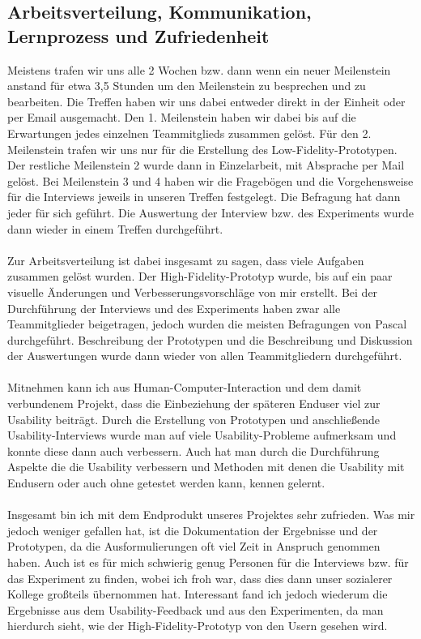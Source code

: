 \documentclass[a4paper,10pt]{scrartcl}
\begin{document}
\subsection{Arbeitsverteilung, Kommunikation, Lernprozess und Zufriedenheit}



Meistens trafen wir uns alle 2 Wochen bzw. dann wenn ein neuer Meilenstein anstand für etwa 3,5 Stunden um den Meilenstein zu besprechen und zu bearbeiten. Die Treffen haben wir uns
dabei entweder direkt in der Einheit oder per Email ausgemacht. Den 1. Meilenstein haben wir dabei bis auf die Erwartungen jedes einzelnen Teammitglieds zusammen gelöst.
Für den 2. Meilenstein trafen wir uns nur für die Erstellung des Low-Fidelity-Prototypen. Der restliche Meilenstein 2 wurde dann in Einzelarbeit, mit Absprache per Mail
gelöst. Bei Meilenstein 3 und 4 haben wir die Fragebögen und die Vorgehensweise für die Interviews
jeweils in unseren Treffen festgelegt. Die Befragung hat dann jeder für sich geführt. Die Auswertung der Interview bzw. des Experiments wurde dann wieder in einem Treffen
durchgeführt.
\\ \\
Zur Arbeitsverteilung ist dabei insgesamt zu sagen, dass viele Aufgaben zusammen gelöst wurden. Der High-Fidelity-Prototyp wurde, bis auf ein paar visuelle Änderungen
und Verbesserungsvorschläge von mir erstellt.
Bei der Durchführung der Interviews und des Experiments haben zwar alle Teammitglieder beigetragen, jedoch wurden die meisten Befragungen von Pascal durchgeführt. Beschreibung
der Prototypen und die Beschreibung und Diskussion der Auswertungen wurde dann wieder von allen Teammitgliedern durchgeführt.
\\ \\
Mitnehmen kann ich aus Human-Computer-Interaction und dem damit verbundenem Projekt, dass die Einbeziehung der späteren Enduser viel zur Usability beiträgt. Durch die Erstellung von Prototypen und anschließende Usability-Interviews wurde man auf viele Usability-Probleme aufmerksam und
konnte diese dann auch verbessern. Auch hat man durch die Durchführung Aspekte die die Usability verbessern und Methoden mit denen die Usability mit Endusern oder auch ohne
getestet werden kann, kennen gelernt.
\\ \\
Insgesamt bin ich mit dem Endprodukt unseres Projektes sehr zufrieden. Was mir jedoch weniger gefallen hat, ist die Dokumentation der Ergebnisse und der Prototypen, da
die Ausformulierungen oft viel Zeit in Anspruch genommen haben. Auch ist es für mich schwierig genug Personen für die Interviews bzw. für das Experiment zu finden, wobei
ich froh war, dass dies dann unser sozialerer Kollege großteils übernommen hat. Interessant fand ich jedoch wiederum die Ergebnisse aus dem Usability-Feedback und aus den Experimenten,
da man hierdurch sieht, wie der High-Fidelity-Prototyp von den Usern gesehen wird.
\end{document}
